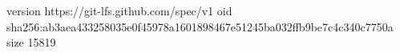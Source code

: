 version https://git-lfs.github.com/spec/v1
oid sha256:ab3aea433258035e0f45978a1601898467e51245ba032ffb9be7c4c340c7750a
size 15819

